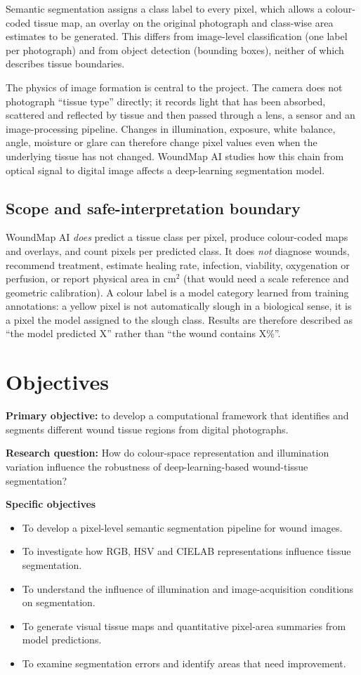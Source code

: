 \documentclass[12pt,a4paper]{article}
\begin{document}
Semantic segmentation assigns a class label to every pixel, which allows a colour-coded tissue map, an overlay on the original photograph and class-wise area estimates to be generated. This differs from image-level classification (one label per photograph) and from object detection (bounding boxes), neither of which describes tissue boundaries.

The physics of image formation is central to the project. The camera does not photograph ``tissue type'' directly; it records light that has been absorbed, scattered and reflected by tissue and then passed through a lens, a sensor and an image-processing pipeline. Changes in illumination, exposure, white balance, angle, moisture or glare can therefore change pixel values even when the underlying tissue has not changed. WoundMap AI studies how this chain from optical signal to digital image affects a deep-learning segmentation model.

\subsection{Scope and safe-interpretation boundary}
WoundMap AI \emph{does} predict a tissue class per pixel, produce colour-coded maps and overlays, and count pixels per predicted class. It does \emph{not} diagnose wounds, recommend treatment, estimate healing rate, infection, viability, oxygenation or perfusion, or report physical area in cm$^2$ (that would need a scale reference and geometric calibration). A colour label is a model category learned from training annotations: a yellow pixel is not automatically slough in a biological sense, it is a pixel the model assigned to the slough class. Results are therefore described as ``the model predicted X'' rather than ``the wound contains X\%''.

\section{Objectives}
\textbf{Primary objective:} to develop a computational framework that identifies and segments different wound tissue regions from digital photographs.

\textbf{Research question:} How do colour-space representation and illumination variation influence the robustness of deep-learning-based wound-tissue segmentation?

\textbf{Specific objectives}
\begin{itemize}
\item To develop a pixel-level semantic segmentation pipeline for wound images.
\item To investigate how RGB, HSV and CIELAB representations influence tissue segmentation.
\item To understand the influence of illumination and image-acquisition conditions on segmentation.
\item To generate visual tissue maps and quantitative pixel-area summaries from model predictions.
\item To examine segmentation errors and identify areas that need improvement.
\end{itemize}
\end{document}
